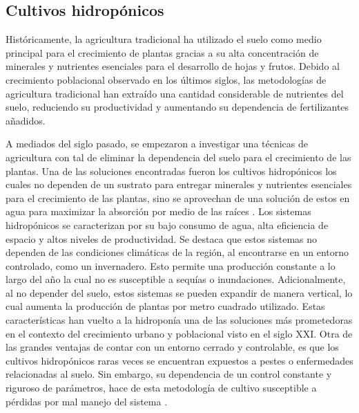 \subsection*{Cultivos hidropónicos}
Históricamente, la agricultura tradicional ha utilizado el suelo como medio principal para el crecimiento de plantas gracias a su alta concentración de minerales y nutrientes esenciales para el desarrollo de hojas y frutos. Debido al crecimiento poblacional observado en los últimos siglos, las metodologías de agricultura tradicional han extraído una cantidad considerable de nutrientes del suelo, reduciendo su productividad y aumentando su dependencia de fertilizantes añadidos. 

A mediados del siglo pasado, se empezaron a investigar una técnicas de agricultura con tal de eliminar la dependencia del suelo para el crecimiento de las plantas. Una de las soluciones encontradas fueron los cultivos hidropónicos los cuales no dependen de un sustrato para entregar minerales y nutrientes esenciales para el crecimiento de las plantas, sino se aprovechan de una solución de estos en agua para maximizar la absorción por medio de las raíces \cite{raviv_soilless_2019}. Los sistemas hidropónicos se caracterizan por su bajo consumo de agua, alta eficiencia de espacio y altos niveles de productividad. Se destaca que estos sistemas no dependen de las condiciones climáticas de la región, al encontrarse en un entorno controlado, como un invernadero. Esto permite una producción constante a lo largo del año la cual no es susceptible a sequías o inundaciones. Adicionalmente, al no depender del suelo, estos sistemas se pueden expandir de manera vertical, lo cual aumenta la producción de plantas por metro cuadrado utilizado. Estas características han vuelto a la hidroponía una de las soluciones más prometedoras en el contexto del crecimiento urbano y poblacional visto en el siglo XXI. Otra de las grandes ventajas de contar con un entorno cerrado y controlable, es que los cultivos hidropónicos raras veces se encuentran expuestos a pestes o enfermedades relacionadas al suelo. Sin embargo, su dependencia de un control constante y riguroso de parámetros, hace de esta metodología de cultivo susceptible a pérdidas por mal manejo del sistema \cite{raviv_soilless_2019}.


